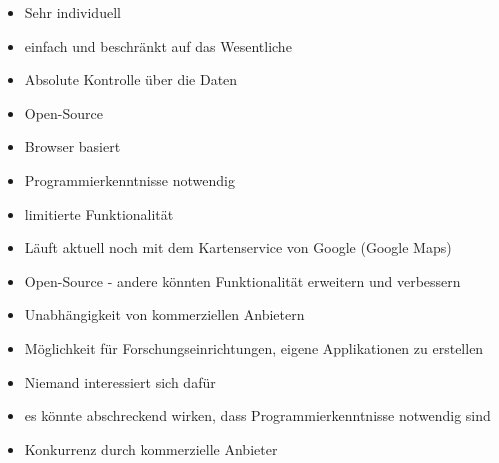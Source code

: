 \documentclass{article}
\begin{document}
\begin{minipage}{0.5\textwidth}
  \begin{tcolorbox}[title=Strengths (Stärken), colframe=blue!50!black, colback=blue!10, height=6cm]
    \begin{itemize}
        \item Sehr individuell
        \item einfach und beschränkt auf das Wesentliche
        \item Absolute Kontrolle über die Daten
        \item Open-Source
    \end{itemize}
  \end{tcolorbox}
\end{minipage}
\hfill
\begin{minipage}{0.5\textwidth}
  \begin{tcolorbox}[title=Weaknesses (Schwächen), colframe=red!50!black, colback=red!10, height=6cm]
    \begin{itemize}
        \item Browser basiert
        \item Programmierkenntnisse notwendig
        \item limitierte Funktionalität
        \item Läuft aktuell noch mit dem Kartenservice von Google (Google Maps)
    \end{itemize}
  \end{tcolorbox}
\end{minipage}

\vspace{1cm}

\begin{minipage}{0.5\textwidth}
  \begin{tcolorbox}[title=Opportunities (Chancen), colframe=green!50!black, colback=green!10, height=6cm]
    \begin{itemize}
        \item Open-Source - andere könnten Funktionalität erweitern und verbessern
        \item Unabhängigkeit von kommerziellen Anbietern
        \item Möglichkeit für Forschungseinrichtungen, eigene Applikationen zu erstellen
    \end{itemize}
  \end{tcolorbox}
\end{minipage}
\hfill
\begin{minipage}{0.5\textwidth}
  \begin{tcolorbox}[title=Threats (Gefahren), colframe=orange!50!black, colback=orange!10, height=6cm]
    \begin{itemize}
        \item Niemand interessiert sich dafür
        \item es könnte abschreckend wirken, dass Programmierkenntnisse notwendig sind
        \item Konkurrenz durch kommerzielle Anbieter
    \end{itemize}
  \end{tcolorbox}
\end{minipage}
\end{document}
